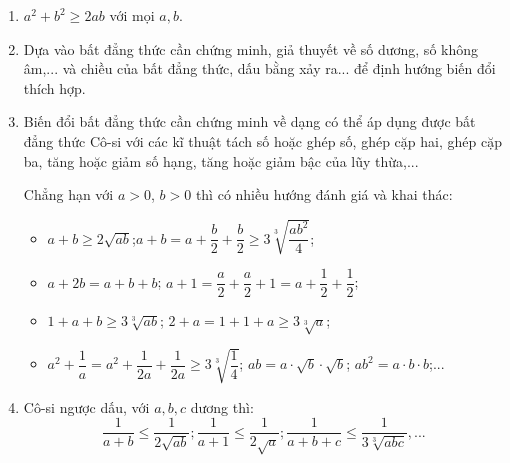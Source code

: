\begin{enumerate}
\item $a^2+b^2\geq 2ab$ với mọi $a, b$.
\item Dựa vào bất đẳng thức cần chứng minh, giả thuyết về số dương, số không âm,... và chiều của bất đẳng thức, dấu bằng xảy ra... để định hướng biến đổi thích hợp.
\item Biến đổi bất đẳng thức cần chứng minh về dạng có thể áp dụng được bất đẳng thức Cô-si với các kĩ thuật tách số hoặc ghép số, ghép cặp hai, ghép cặp ba, tăng hoặc giảm số hạng, tăng hoặc giảm bậc của lũy thừa,... 

Chẳng hạn với $a>0$, $b>0$ thì có nhiều hướng đánh giá và khai thác:
\begin{itemize}
\item $a+b\geq 2\sqrt{ab}$;$a+b=a+\dfrac{b}{2}+\dfrac{b}{2}\geq 3\sqrt[3]{\dfrac{ab^2}{4}}$;
\item $a+2b=a+b+b$; $a+1=\dfrac{a}{2}+\dfrac{a}{2}+1=a+\dfrac{1}{2}+\dfrac{1}{2}$;
\item $1+a+b\geq 3\sqrt[3]{ab}$; $2+a=1+1+a\geq 3\sqrt[3]{a}$;
\item $a^2+\dfrac{1}{a}=a^2+\dfrac{1}{2a}+\dfrac{1}{2a}\geq 3\sqrt[3]{\dfrac{1}{4}}$; $ab=a\cdot \sqrt{b}\cdot\sqrt{b}$; $ab^2=a\cdot b\cdot b$;...
\end{itemize}
\item Cô-si ngược dấu, với $a, b, c$ dương thì:
$$\dfrac{1}{a+b}\leq \dfrac{1}{2\sqrt{ab}}; \dfrac{1}{a+1}\leq \dfrac{1}{2\sqrt{a}}; \dfrac{1}{a+b+c}\leq \dfrac{1}{3\sqrt[3]{abc}},...$$
\end{enumerate}

